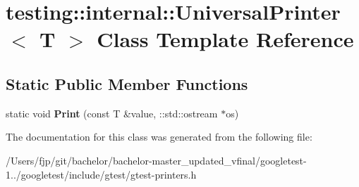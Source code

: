 \hypertarget{classtesting_1_1internal_1_1_universal_printer}{}\section{testing\+:\+:internal\+:\+:Universal\+Printer$<$ T $>$ Class Template Reference}
\label{classtesting_1_1internal_1_1_universal_printer}
\subsection*{Static Public Member Functions}
\begin{DoxyCompactItemize}
\item 
\mbox{\label{classtesting_1_1internal_1_1_universal_printer_aecec021e1abbaa260b701e24e3fe33eb}} 
static void {\bfseries Print} (const T \&value, \+::std\+::ostream $\ast$os)
\end{DoxyCompactItemize}


The documentation for this class was generated from the following file\+:\begin{DoxyCompactItemize}
\item 
/\+Users/fjp/git/bachelor/bachelor-\/master\+\_\+updated\+\_\+vfinal/googletest-\/1../googletest/include/gtest/gtest-\/printers.\+h\end{DoxyCompactItemize}
